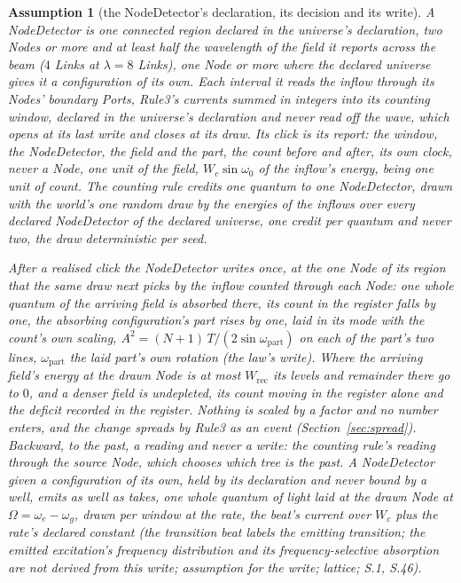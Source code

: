\documentclass[pdflatex,sn-mathphys-num]{sn-jnl}
\newcommand{\Wc}{W_c}
\theoremstyle{thmstyleone}
\theoremstyle{thmstyletwo}
\newtheorem{assumption}{Assumption}
\begin{document}
\begin{assumption}[the NodeDetector's declaration, its decision and its write]\label{as:node-reader}
A NodeDetector is one connected region declared in the universe's declaration, two Nodes or more and at least half the wavelength of the field it reports across the beam ($4$ Links at $\lambda = 8$ Links), one Node or more where the declared universe gives it a configuration of its own. Each interval it reads the inflow through its Nodes' boundary Ports, Rule3's currents summed in integers into its counting window, declared in the universe's declaration and never read off the wave, which opens at its last write and closes at its draw. Its click is its report: the window, the NodeDetector, the field and the part, the count before and after, its own clock, never a Node, one unit of the field, $\Wc\sin\omega_0$ of the inflow's energy, being one unit of count. The counting rule credits one quantum to one NodeDetector, drawn with the world's one random draw by the energies of the inflows over every declared NodeDetector of the declared universe, one credit per quantum and never two, the draw deterministic per seed.

After a realised click the NodeDetector writes once, at the one Node of its region that the same draw next picks by the inflow counted through each Node: one whole quantum of the arriving field is absorbed there, its count in the register falls by one, the absorbing configuration's part rises by one, laid in its mode with the count's own scaling, $A^2 = (N + 1)\,T / (2\sin\omega_{\mathrm{part}})$ on each of the part's two lines, $\omega_{\mathrm{part}}$ the laid part's own rotation (the law's write). Where the arriving field's energy at the drawn Node is at most $W_{\mathrm{rec}}$ its levels and remainder there go to $0$, and a denser field is undepleted, its count moving in the register alone and the deficit recorded in the register. Nothing is scaled by a factor and no number enters, and the change spreads by Rule3 as an event (Section~\ref{sec:spread}). Backward, to the past, a reading and never a write: the counting rule's reading through the source Node, which chooses which tree is the past. A NodeDetector given a configuration of its own, held by its declaration and never bound by a well, emits as well as takes, one whole quantum of light laid at the drawn Node at $\Omega = \omega_e - \omega_g$, drawn per window at the rate, the beat's current over $\Wc$ plus the rate's declared constant (the transition beat labels the emitting transition; the emitted excitation's frequency distribution and its frequency-selective absorption are not derived from this write; assumption for the write; lattice; S.1, S.46).
\end{assumption}
\end{document}
